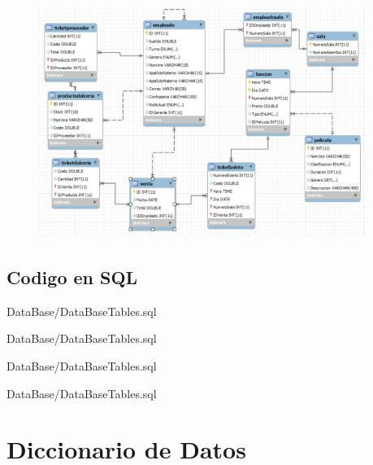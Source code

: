 \documentclass[12pt, fleqn]{report}                             %
\begin{document}
            \begin{figure}[h]
                \centering
                \includegraphics[width=0.95\textwidth]{DataBase/Relations2.png}
            \end{figure}

        \clearpage
        \subsection{Codigo en SQL}

            
            {DataBase/DataBaseTables.sql}
            \clearpage

            
            {DataBase/DataBaseTables.sql}
            \clearpage

            
            {DataBase/DataBaseTables.sql}
            \clearpage

            
            {DataBase/DataBaseTables.sql}



    \clearpage
    \section{Diccionario de Datos}
\end{document}
